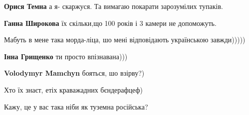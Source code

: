 \begin{itemize}
\begin{itemize}
\textbf{Орися Темна} а я- скаржуся.
Та вимагаю покарати зарозумілих тупаків.

 
\textbf{Ганна Широкова} їх скільки,що 100 років і 3 камери не допоможуть.
\end{itemize}

 
Мабуть в мене така морда-ліца, шо мені відповідають українською завжди)))))

\begin{itemize}
 
\textbf{Інна Грищенко} ти просто впізнавана)))

 
\textbf{Volodymyr Mamchyn} бояться, шо взірву?)

 
Хто їх знаєт, етіх краважадних бєндерафцеф)
\end{itemize}

 
Кажу, це у вас така ніби як туземна російська?


\end{itemize}
